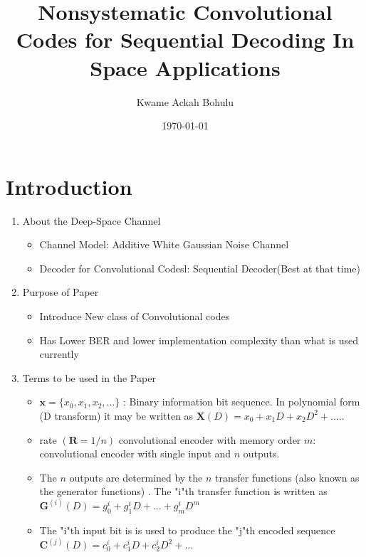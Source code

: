 \documentclass[fontsize=12pt]{article}
\title{Nonsystematic Convolutional Codes for Sequential Decoding In Space Applications}
\author{Kwame Ackah Bohulu}
\date{\today}
\begin{document}
\maketitle

\newpage


\section{Introduction}

\begin{enumerate}

\item {About the Deep-Space Channel}
\begin{itemize}
\item Channel Model: Additive White Gaussian Noise Channel

\item Decoder for Convolutional Codesl: Sequential Decoder(Best at that time)
\end{itemize}


\item {Purpose of Paper}
\begin{itemize}
\item Introduce New class of Convolutional codes

\item Has Lower BER and lower implementation complexity than what is used currently
\end{itemize}

\item {Terms to be used in the Paper}
\begin{itemize}
\item $\mathbf{x}=\{x_0,x_1,x_2,...\}$ : Binary information bit sequence. In polynomial form (D transform) it may be written as $\mathbf{X}(D)=x_0+x_1D+x_2D^2+.....$

\item rate $(\mathbf{R}=1/n)$ convolutional encoder with memory order $m$: convolutional encoder with single input and $n$ outputs. 

\item The $n$ outputs are determined by the $n$ transfer functions (also known as the generator functions) . The "i"th transfer function is written as $\mathbf{\mathbf{\mathbf{G}}}^{(i)}(D)=g_0^{i}+g_1^{i}D+...+g_m^{i}D^m$

\item The "i"th input bit is is used to produce the "j"th encoded sequence $\mathbf{C}^{(j)}(D)=c^{i}_0+c^{i}_1D+c^{i}_2D^2+...$ 


\end{itemize}
\end{enumerate}
\end{document}
